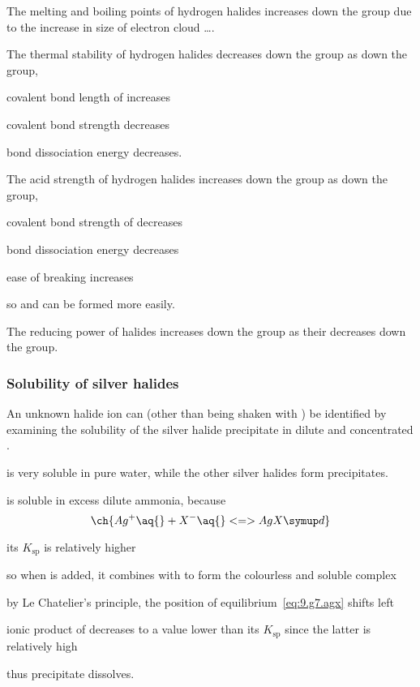 \documentclass[Chemistry.tex]{subfiles}
\begin{document}
The melting and boiling points of hydrogen halides increases down the group due to the increase in size of electron cloud \ldots{}.

The thermal stability of hydrogen halides decreases down the group as down the group, \begin{slinenum}
\item covalent bond length of  increases
\item covalent bond strength decreases
\item bond dissociation energy decreases.
\end{slinenum}

The acid strength of hydrogen halides increases down the group as down the group, \begin{slinenum}
\item covalent bond strength of  decreases
\item bond dissociation energy decreases
\item ease of breaking  increases
\item so  and  can be formed more easily.
\end{slinenum}

The reducing power of halides increases down the group as their \slEo{} decreases down the group.
\subsubsection{Solubility of silver halides}
An unknown halide ion can (other than being shaken with ) be identified by examining the solubility of the silver halide precipitate in dilute and concentrated .

 is very soluble in pure water, while the other silver halides form precipitates.

 is soluble in excess dilute ammonia, because \begin{equation}\label{eq:9.g7.agx}\ch{Ag^+\aq{} + X^-\aq{} <=> AgX\solid{}}\end{equation}\begin{slinenum}
\item its \(K_\text{sp}\) is relatively higher
\item so when  is added, it combines with  to form the colourless and soluble \slch{[Ag(NH3)2]^+} complex
\item by Le Chatelier's principle, the position of equilibrium~\eqref{eq:9.g7.agx} shifts left
\item ionic product of  decreases to a value lower than its \(K_\text{sp}\) since the latter is relatively high
\item thus  precipitate dissolves.
\end{slinenum}
\end{document}

